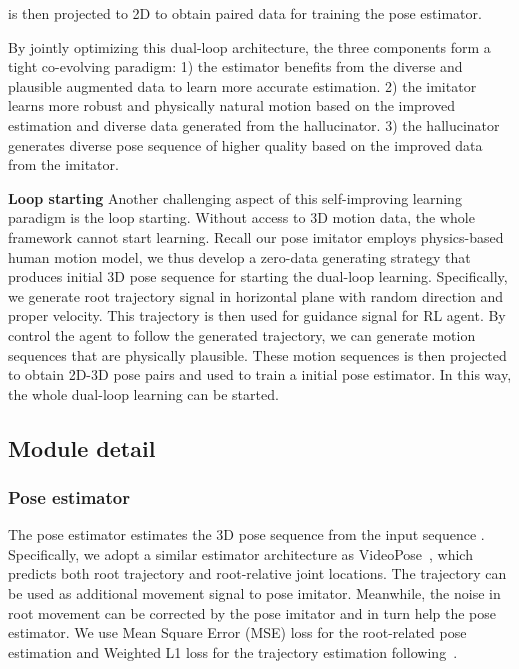 \documentclass[10pt,twocolumn,letterpaper]{article}
\begin{document}
 is then projected to 2D to obtain paired data  for training the pose estimator.

By jointly optimizing this dual-loop architecture, the three components form a tight co-evolving paradigm: 
1) the estimator benefits from the diverse and plausible augmented data to learn more accurate estimation.
2) the imitator learns more robust and physically natural motion based on the improved estimation and diverse data generated from the hallucinator.
3) the hallucinator generates diverse pose sequence of higher quality based on the improved data from the imitator.







\noindent \textbf{Loop starting}
Another challenging aspect of this self-improving learning paradigm is the loop starting. Without access to 3D motion data, the whole framework cannot start learning. Recall our pose imitator employs physics-based human motion model, we thus develop a zero-data generating strategy that produces initial 3D pose sequence for starting the dual-loop learning.
Specifically, we generate root trajectory signal in horizontal plane with random direction and proper velocity.
This trajectory is then used for guidance signal for RL agent.
By control the agent to follow the generated trajectory, we can generate motion sequences that are physically plausible.
These motion sequences is then projected to obtain 2D-3D pose pairs and used to train a initial pose estimator. 
In this way, the whole dual-loop learning can be started.




\subsection{Module detail}



\subsubsection{Pose estimator}
The pose estimator estimates the 3D pose sequence  from the input sequence . 
Specifically, we adopt a similar estimator architecture as VideoPose~\cite{pavllo2019videopose3d}, which predicts both root trajectory and root-relative joint locations. The trajectory can be used as additional movement signal to pose imitator.
Meanwhile, the noise in root movement can be corrected by the pose imitator and in turn help the pose estimator.
We use Mean Square Error (MSE) loss for the root-related pose estimation and Weighted L1 loss for the trajectory estimation following~\cite{pavllo2019videopose3d}.
\end{document}

